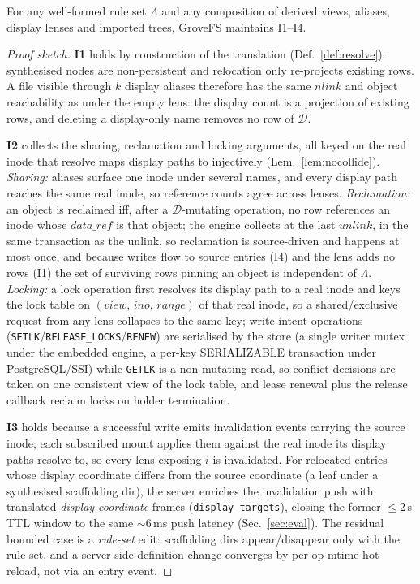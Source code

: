 \documentclass[numberedsection,acmtos]{acmart}
\begin{document}
\begin{theorem}\label{thm:main}
For any well-formed rule set $\Lambda$ and any composition of derived views,
aliases, display lenses and imported trees, GroveFS maintains I1--I4.
\end{theorem}
\begin{proof}[Proof sketch]
\textbf{I1} holds by construction of the translation (Def.~\ref{def:resolve}):
synthesised nodes are non-persistent and relocation only re-projects existing
rows. A file visible through $k$ display aliases therefore has the same
$\mathit{nlink}$ and object reachability as under the empty lens: the display
count is a projection of existing rows, and deleting a display-only name
removes no row of $\mathcal{D}$.

\textbf{I2} collects the sharing, reclamation and locking arguments, all keyed
on the real inode that resolve maps display paths to injectively
(Lem.~\ref{lem:nocollide}). \emph{Sharing:} aliases surface one inode under
several names, and every display path reaches the same real inode, so
reference counts agree across lenses. \emph{Reclamation:} an object is
reclaimed iff, after a $\mathcal{D}$-mutating operation, no row references an
inode whose $\mathit{data\_ref}$ is that object; the engine collects at the
last $\mathit{unlink}$, in the same transaction as the unlink, so reclamation
is source-driven and happens at most once, and because writes flow to source
entries (I4) and the lens adds no rows (I1) the set of surviving rows pinning
an object is independent of $\Lambda$. \emph{Locking:} a lock operation first
resolves its display path to a real inode and keys the lock table on
$(\mathit{view},\,\mathit{ino},\,\mathit{range})$ of that real inode, so a
shared/exclusive request from any lens collapses to the same key;
write-intent operations
(\texttt{SETLK}/\texttt{RELEASE\_LOCKS}/\texttt{RENEW}) are serialised by the
store (a single writer mutex under the embedded engine, a per-key SERIALIZABLE
transaction under PostgreSQL/SSI) while \texttt{GETLK} is a non-mutating read,
so conflict decisions are taken on one consistent view of the lock table, and
lease renewal plus the release callback reclaim locks on holder termination.

\textbf{I3} holds because a successful write emits invalidation events carrying
the source inode; each subscribed mount applies them against the real inode its
display paths resolve to, so every lens exposing $i$ is invalidated. For
relocated entries whose display coordinate differs from the source coordinate
(a leaf under a synthesised scaffolding dir), the server enriches the
invalidation push with translated \emph{display-coordinate} frames
(\texttt{display\_targets}), closing the former $\leq$2\,s TTL window to the
same $\sim$6\,ms push latency (Sec.~\ref{sec:eval}). The residual bounded case
is a \emph{rule-set} edit: scaffolding dirs appear/disappear only with the
rule set, and a server-side definition change converges by per-op mtime
hot-reload, not via an entry event.


\end{proof}
\end{document}
